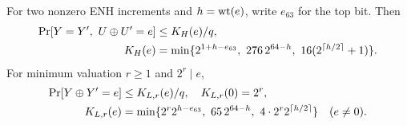 \begin{lemma}\label{lem:target}
For two nonzero ENH increments and $h=\operatorname{wt}(e)$, write $e_{63}$ for the top bit. Then
\begin{align}
 \Prb[Y=Y',\ U\xor U'=e]&\le K_H(e)/q,\nonumber\\
 K_H(e)&=\min\{2^{1+h-e_{63}},\ 276\,2^{64-h},\ 16(2^{\ceil{h/2}}+1)\}.\label{eq:KH}
\end{align}
For minimum valuation $r\ge1$ and $2^r\mid e$,
\begin{align}
 \Prb[Y\xor Y'=e]&\le K_{L,r}(e)/q,\quad K_{L,r}(0)=2^r,\nonumber\\
 K_{L,r}(e)&=\min\{2^r2^{h-e_{63}},\ 65\,2^{64-h},\ 4\cdot2^r2^{\ceil{h/2}}\}\quad(e\ne0).\label{eq:KL}
\end{align}
\end{lemma}
